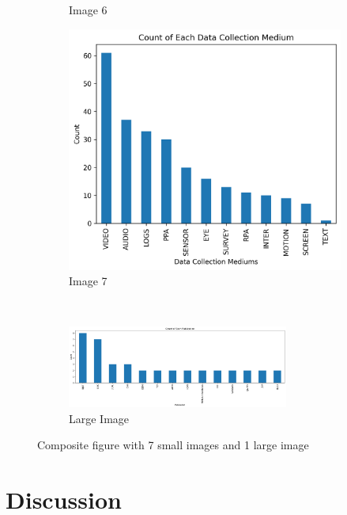 \documentclass[manuscript,screen,review]{acmart}
\begin{document}
\begin{figure}[htbp]
\begin{subfigure}[b]{0.33\textwidth}
        \caption{Image 6}
    \end{subfigure}
    \hfill
    \begin{subfigure}[b]{0.33\textwidth}
        \includegraphics[width=\textwidth]{img/statistical_imgs/data_collection_mediums.png}
        \caption{Image 7}
    \end{subfigure}
    \\
    \begin{subfigure}[b]{\textwidth}
        \includegraphics[width=0.8\textwidth]{img/statistical_imgs/publications_w_o_others.png}
        \caption{Large Image}
    \end{subfigure}
    \caption{Composite figure with 7 small images and 1 large image}
\end{figure}


\section{Discussion} \label{sec:discussion}
\end{document}
